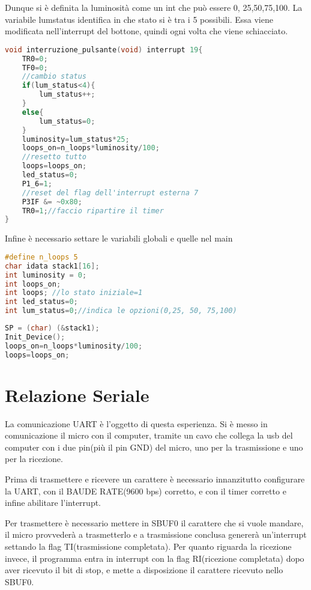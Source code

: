 \documentclass[main.tex]{subfiles}
\begin{document}
 Dunque si è definita la luminosità come un int che può essere 0, 25,50,75,100. La variabile lumstatus identifica in che stato si è tra i 5 possibili. Essa viene modificata nell'interrupt del bottone, quindi ogni volta che viene schiacciato.
 \begin{lstlisting}[language=C, caption=Interrupt pulsante]
 void interruzione_pulsante(void) interrupt 19{
	TR0=0;
	TF0=0;
	//cambio status
	if(lum_status<4){
		lum_status++;
	}
	else{
		lum_status=0;
	}
	luminosity=lum_status*25;
	loops_on=n_loops*luminosity/100;
	//resetto tutto
	loops=loops_on;
	led_status=0;
	P1_6=1;
	//reset del flag dell'interrupt esterna 7
	P3IF &= ~0x80;
	TR0=1;//faccio ripartire il timer
}
 \end{lstlisting}

Infine è necessario settare le variabili globali e quelle nel main
\begin{lstlisting}[language=C,caption=Variabili globali]
#define n_loops 5
char idata stack1[16];
int luminosity = 0;
int loops_on;
int loops; //lo stato iniziale=1
int led_status=0;
int lum_status=0;//indica le opzioni(0,25, 50, 75,100)
\end{lstlisting}
\begin{lstlisting}[language=C,caption=main]
SP = (char) (&stack1);
Init_Device();
loops_on=n_loops*luminosity/100;
loops=loops_on;
\end{lstlisting}



\section{Relazione Seriale}
La comunicazione UART è l'oggetto di questa esperienza. Si è messo in comunicazione il micro con il computer, tramite un cavo che collega la usb del computer con i due pin(più il pin GND) del micro, uno per la trasmissione e uno per la ricezione.

Prima di trasmettere e ricevere un carattere è necessario innanzitutto configurare la UART, con il BAUDE RATE(9600 bps) corretto, e con il timer corretto e infine abilitare l'interrupt.  

Per trasmettere è necessario mettere in SBUF0 il carattere che si vuole mandare, il micro provvederà a trasmetterlo e a trasmissione conclusa genererà un'interrupt settando la flag TI(trasmissione completata). Per quanto riguarda la ricezione invece, il programma entra in interrupt con la flag RI(ricezione completata) dopo aver ricevuto il bit di stop, e mette a disposizione il carattere ricevuto nello SBUF0.  
\end{document}
